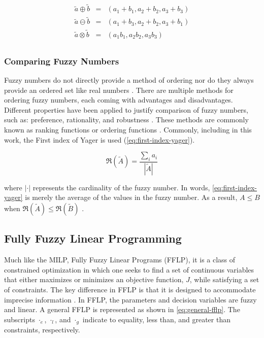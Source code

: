 \documentclass[ee,msthesis]{usuthesis}
\begin{document}
\begin{equation}
\label{eq:fuzzy-arithmetic}
\begin{array}{lcl}
\tilde{a} \oplus \tilde{b} & = & (a_1 + b_1, a_2 + b_2, a_3 + b_3) \\
\tilde{a} \ominus \tilde{b} & = & (a_1 + b_3, a_2 + b_2, a_3 + b_1) \\
\tilde{a} \otimes \tilde{b} & = & (a_1 b_1, a_2 b_2, a_3 b_3)       \\
\end{array}
\end{equation}

\subsubsection{Comparing Fuzzy Numbers}
\label{sec:org0761503}
Fuzzy numbers do not directly provide a method of ordering nor do they always provide an ordered set like real numbers
\cite{bello-2019-fuzzy-activ}. There are multiple methods for ordering fuzzy numbers, each coming with advantages and
disadvantages. Different properties have been applied to justify comparison of fuzzy numbers, such as: preference,
rationality, and robustness \cite{jimenez-2007-linear-progr,bello-2019-fuzzy-activ,kaur-2016-introd-fuzzy}. These
methods are commonly known as ranking functions or ordering functions
\cite{bello-2019-fuzzy-activ,das-2016-mathem-model,kaur-2016-introd-fuzzy}. Commonly, including in this work, the First
index of Yager \cite{yager-1981-proced-order} is used (\ref{eq:first-index-yager}).

\begin{equation}
\label{eq:first-index-yager}
\mathfrak{R}(\tilde{A}) = \frac{\sum_i a_i}{|\tilde{A}|}
\end{equation}

\noindent where \(|\cdot|\) represents the cardinality of the fuzzy number. In words, \ref{eq:first-index-yager} is merely the
average of the values in the fuzzy number. As a result, \(A \le B\) when \(\mathfrak{R}(\tilde{A}) \le \mathfrak{R}(\tilde{B})\)
\cite{bello-2019-fuzzy-activ}.

\subsection{Fully Fuzzy Linear Programming}
\label{sec:fully-fuzzy-linear-programming}
Much like the MILP, Fully Fuzzy Linear Programs (FFLP), it is a class of constrained optimization in which one seeks to
find a set of continuous variables that either maximizes or minimizes an objective function, \(J\), while satisfying a set
of constraints. The key difference in FFLP is that it is designed to accommodate imprecise information
\cite{bello-2019-fuzzy-activ,kaur-2016-introd-fuzzy}. In FFLP, the parameters and decision variables are fuzzy and
linear. A general FFLP is represented as shown in \ref{eq:general-fflp}. The subscripts \(\cdot_e\), \(\cdot_l\), and \(\cdot_g\) indicate to
equality, less than, and greater than constraints, respectively.
\end{document}
